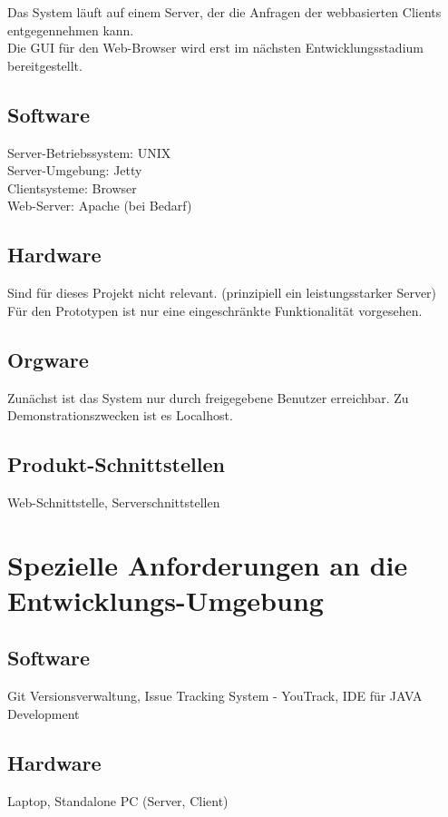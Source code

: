 	Das System läuft auf einem Server, der die Anfragen der webbasierten Clients entgegennehmen kann.\\
	Die GUI für den Web-Browser wird erst im nächsten Entwicklungsstadium bereitgestellt.
	
		\subsection{Software}
		Server-Betriebssystem: UNIX\\
		Server-Umgebung: Jetty\\
		Clientsysteme: Browser\\
		Web-Server: Apache (bei Bedarf)
		
		\subsection{Hardware}
		Sind für dieses Projekt nicht relevant. (prinzipiell ein leistungsstarker Server)\\
		Für den Prototypen ist nur eine eingeschränkte Funktionalität vorgesehen.
		
		\subsection{Orgware}
		
		Zunächst ist das System nur durch freigegebene Benutzer erreichbar. Zu Demonstrationszwecken ist es Localhost.		

		\subsection{Produkt-Schnittstellen}
		
		Web-Schnittstelle, Serverschnittstellen
		
	\section{Spezielle Anforderungen an die Entwicklungs-Umgebung}
		\subsection{Software}
		Git Versionsverwaltung, Issue Tracking System - YouTrack, IDE für JAVA Development
		
		\subsection{Hardware}
		Laptop, Standalone PC (Server, Client)
